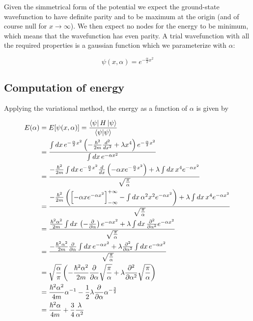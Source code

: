 \documentclass{article}
\begin{document}
Given the simmetrical form of the potential we expect the ground-state wavefunction to have definite parity and to be maximum at the origin (and of course null for \( x \rightarrow \infty \)). We then expect no nodes for the energy to be minimum, which means that the wavefunction has even parity. A trial wavefunction with all the required properties is a gaussian function which we parameterize with \(\alpha\):

\begin{equation}
\psi(x,\alpha) = e^{-\frac{\alpha}{2}x^2}
\end{equation}

\subsection{Computation of energy}
Applying the variational method, the energy as a function of \(\alpha\) is given by

\begin{align}
E(\alpha) & = E[\psi(x, \alpha)] = \frac{\bra{\psi} H \ket{\psi}}{\braket{\psi}{\psi}} \nonumber \\
& = \frac{\int dx \, e^{-\frac{\alpha}{2}x^2} \left( -\frac{\hbar^2}{2m} \frac{d^2}{dx^2} + \lambda x^4 \right) e^{-\frac{\alpha}{2}x^2}}{\int dx \, e^{-\alpha x^2}} \nonumber \\
& = \frac{-\frac{\hbar^2}{2m} \int dx \, e^{-\frac{\alpha}{2}x^2} \frac{d}{dx} \left(-\alpha x e^{-\frac{\alpha}{2}x^2} \right) + \lambda \int dx \, x^4 e^{-\alpha x^2}}{\sqrt{\frac{\pi}{\alpha}}} \nonumber \\
& = \frac{-\frac{\hbar^2}{2m} \left( \left[-\alpha x e^{-\alpha x^2} \right]_{-\infty}^{+\infty} - \int dx \, \alpha^2 x^2 e^{-\alpha x^2} \right) + \lambda \int dx \, x^4 e^{-\alpha x^2}}{\sqrt{\frac{\pi}{\alpha}}} \nonumber \\
& = \frac{\frac{\hbar^2\alpha^2}{2m} \int dx \, \left( -\frac{\partial}{\partial \alpha} \right) e^{-\alpha x^2} + \lambda \int dx \, \frac{\partial^2}{\partial \alpha^2} e^{-\alpha x^2}}{\sqrt{\frac{\pi}{\alpha}}} \nonumber \\
& = \frac{-\frac{\hbar^2\alpha^2}{2m} \frac{\partial}{\partial \alpha} \int dx \, e^{-\alpha x^2} + \lambda \frac{\partial^2}{\partial \alpha^2} \int dx \, e^{-\alpha x^2}}{\sqrt{\frac{\pi}{\alpha}}} \nonumber \\
& = \sqrt{\frac{\alpha}{\pi}} \left( -\frac{\hbar^2\alpha^2}{2m} \frac{\partial}{\partial \alpha} \sqrt{\frac{\pi}{\alpha}} + \lambda \frac{\partial^2}{\partial \alpha^2} \sqrt{\frac{\pi}{\alpha}} \right) \nonumber \\
& = \frac{\hbar^2\alpha^2}{4m}\alpha^{-1} -\frac{1}{2} \lambda \frac{\partial}{\partial \alpha} \alpha^{-\frac{3}{2}} \nonumber \\
& = \frac{\hbar^2\alpha}{4m} + \frac{3}{4} \frac{\lambda}{\alpha^2}
\end{align}
\end{document}

